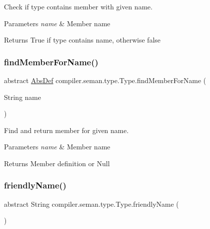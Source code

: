 Check if type contains member with given name. 
\begin{DoxyParams}{Parameters}
{\em name} & Member name \\
\hline
\end{DoxyParams}
\begin{DoxyReturn}{Returns}
True if type contains name, otherwise false 
\end{DoxyReturn}
\mbox{\label{classcompiler_1_1seman_1_1type_1_1_type_a5b4efe8679a43a9f8a2f2e8aa5fd9c02}} 
\subsubsection{\texorpdfstring{find\+Member\+For\+Name()}{findMemberForName()}}
{\footnotesize\ttfamily abstract \hyperlink{classcompiler_1_1abstr_1_1tree_1_1def_1_1_abs_def}{Abs\+Def} compiler.\+seman.\+type.\+Type.\+find\+Member\+For\+Name (\begin{DoxyParamCaption}\item[{String}]{name }\end{DoxyParamCaption})\hspace{0.3cm}{\ttfamily [abstract]}}

Find and return member for given name. 
\begin{DoxyParams}{Parameters}
{\em name} & Member name \\
\hline
\end{DoxyParams}
\begin{DoxyReturn}{Returns}
Member definition or Null 
\end{DoxyReturn}
\mbox{\label{classcompiler_1_1seman_1_1type_1_1_type_a10c3230bf454e5ea2fd8b63953fca9fc}} 
\subsubsection{\texorpdfstring{friendly\+Name()}{friendlyName()}}
{\footnotesize\ttfamily abstract String compiler.\+seman.\+type.\+Type.\+friendly\+Name (\begin{DoxyParamCaption}{ }\end{DoxyParamCaption})\hspace{0.3cm}{\ttfamily [abstract]}}

